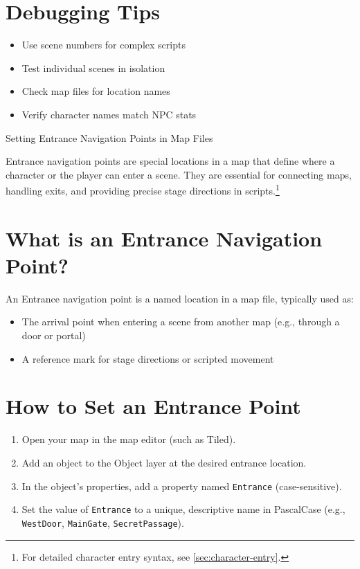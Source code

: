 \documentclass[11pt,letterpaper,oldstylefigures]{memoir}
\makeatletter
\let\oldchapter\chapter
\def\chapter{%
  \@ifstar
    {\FountainScripting@starchapter}%
    {\@dblarg\FountainScripting@chapter}}
\def\FountainScripting@starchapter#1{\oldchapter*{#1}\chaptermark{#1}}
\def\FountainScripting@chapter[#1]#2{\oldchapter[#1]{#2}\chaptermark{#2}}
\makeatother
\begin{document}
\section{Debugging Tips}

\begin{itemize}
\item Use scene numbers for complex scripts
\item Test individual scenes in isolation
\item Check map files for location names
\item Verify character names match NPC stats
\end{itemize}

\chapter{Setting Entrance Navigation Points in Map Files}
\label{chap:entrance-navigation-points}

Entrance navigation points are special locations in a map that define where a character or the player can enter a scene. They are essential for connecting maps, handling exits, and providing precise stage directions in scripts.\footnote{For detailed character entry syntax, see \autoref{sec:character-entry}.}

\section{What is an Entrance Navigation Point?}
An Entrance navigation point is a named location in a map file, typically used as:
\begin{itemize}
  \item The arrival point when entering a scene from another map (e.g., through a door or portal)
  \item A reference mark for stage directions or scripted movement
\end{itemize}

\section{How to Set an Entrance Point}
\begin{enumerate}
  \item Open your map in the map editor (such as Tiled).
  \item Add an object to the Object layer at the desired entrance location.
  \item In the object's properties, add a property named \texttt{Entrance} (case-sensitive).
  \item Set the value of \texttt{Entrance} to a unique, descriptive name in PascalCase (e.g., \texttt{WestDoor}, \texttt{MainGate}, \texttt{SecretPassage}).
\end{enumerate}
\end{document}
